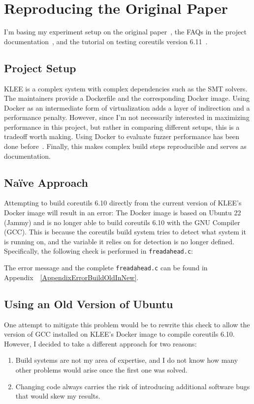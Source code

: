 \documentclass{article}
\let\savedCite=\cite
\renewcommand{\cite}{\unskip~\savedCite}
\let\savedRef=\ref
\renewcommand{\ref}{\unskip~\savedRef}
\begin{document}
\section{Reproducing the Original Paper}
\label{Reproducing}
I'm basing my experiment setup on the original paper\cite{KLEE}, the FAQs in the project documentation\cite{KLEEFAQ}, and the tutorial on testing coreutils version 6.11\cite{KLEETutorial}.

\subsection{Project Setup}
\label{ProjectSetup}
KLEE is a complex system with complex dependencies such as the SMT solvers. The maintainers provide a Dockerfile and the corresponding Docker image. Using Docker as an intermediate form of virtualization adds a layer of indirection and a performance penalty. However, since I'm not necessarily interested in maximizing performance in this project, but rather in comparing different setups, this is a tradeoff worth making. Using Docker to evaluate fuzzer performance has been done before\cite{UNIFUZZ}. Finally, this makes complex build steps reproducible and serves as documentation.
\subsection{Naïve Approach}

Attempting to build coreutils 6.10 directly from the current version of KLEE's Docker image will result in an error: The Docker image is based on Ubuntu 22 (Jammy) and is no longer able to build coreutils 6.10 with the GNU Compiler (GCC). This is because the coreutils build system tries to detect what system it is running on, and the variable it relies on for detection is no longer defined. Specifically, the following check is performed in \lstinline{freadahead.c}:



The error message and the complete \lstinline{freadahead.c} can be found in Appendix~\ref{AppendixErrorBuildOldInNew}.

\subsection{Using an Old Version of Ubuntu}
\label{OldVersion}

One attempt to mitigate this problem would be to rewrite this check to allow the version of GCC installed on KLEE's Docker image to compile coreutils 6.10. However, I decided to take a different approach for two reasons:
\begin{enumerate}
    \item Build systems are not my area of expertise, and I do not know how many other problems would arise once the first one was solved.
    \item Changing code always carries the risk of introducing additional software bugs that would skew my results.
\end{enumerate}
\end{document}
